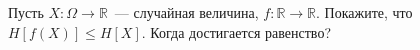 Пусть $X: \Omega \to \mathbb{R}$~--- случайная величина, $f: \mathbb{R} \to \mathbb{R}$. Покажите, что $H[f(X)] \le
H[X]$. Когда достигается равенство?
